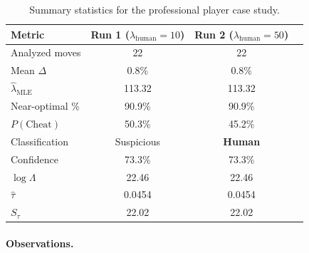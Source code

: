 \documentclass[11pt,a4paper]{article}
\begin{document}
\begin{table}[H]
\centering
\caption{Summary statistics for the professional player case study.}
\label{tab:experiment1}
\begin{tabular}{lccc}
\toprule
Metric & Run 1 ($\lambda_{\text{human}} = 10$) & Run 2 ($\lambda_{\text{human}} = 50$) \\
\midrule
Analyzed moves         & 22       & 22       \\
Mean $\Delta$          & 0.8\%    & 0.8\%    \\
$\hat{\lambda}_\text{MLE}$ & 113.32 & 113.32 \\
Near-optimal \%        & 90.9\%   & 90.9\%   \\
$P(\text{Cheat})$      & 50.3\%   & 45.2\%   \\
Classification         & Suspicious & \textbf{Human} \\
Confidence             & 73.3\%   & 73.3\%   \\
$\log \Lambda$         & 22.46    & 22.46    \\
$\hat{\tau}$           & 0.0454   & 0.0454   \\
$S_\tau$               & 22.02    & 22.02    \\
\bottomrule
\end{tabular}
\end{table}

\paragraph{Observations.}
\end{document}
